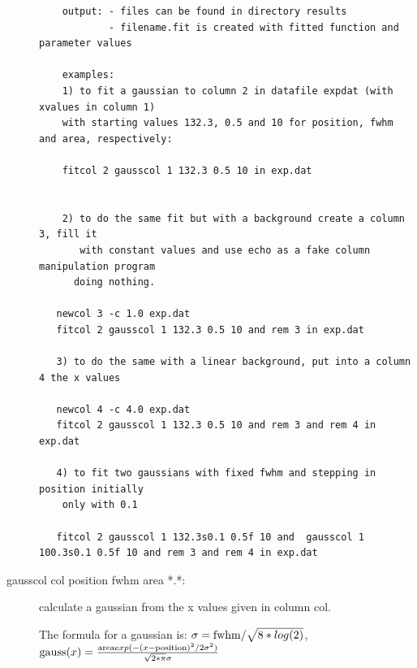 \begin{description}
\begin{verbatim}
    output: - files can be found in directory results
            - filename.fit is created with fitted function and parameter values

    examples:
    1) to fit a gaussian to column 2 in datafile expdat (with xvalues in column 1)
    with starting values 132.3, 0.5 and 10 for position, fwhm and area, respectively:

    fitcol 2 gausscol 1 132.3 0.5 10 in exp.dat


    2) to do the same fit but with a background create a column 3, fill it
       with constant values and use echo as a fake column manipulation program
      doing nothing.

   newcol 3 -c 1.0 exp.dat
   fitcol 2 gausscol 1 132.3 0.5 10 and rem 3 in exp.dat

   3) to do the same with a linear background, put into a column 4 the x values

   newcol 4 -c 4.0 exp.dat
   fitcol 2 gausscol 1 132.3 0.5 10 and rem 3 and rem 4 in exp.dat

   4) to fit two gaussians with fixed fwhm and stepping in position initially
    only with 0.1

   fitcol 2 gausscol 1 132.3s0.1 0.5f 10 and  gausscol 1 100.3s0.1 0.5f 10 and rem 3 and rem 4 in exp.dat
\end{verbatim}

\item[\prg gausscol\index{gausscol} col position fwhm area *.*:] calculate a
gaussian from the x values given in column col.

The formula for a gaussian is:
$\sigma={\rm fwhm}/\sqrt{8*log(2)}$,
${\rm gauss}(x)=\frac{{\rm area} exp(-(x-{\rm position})^2/2 \sigma^2)}{\sqrt{2*\pi}\sigma}$


\end{description}

